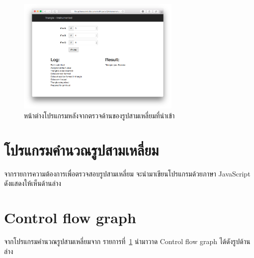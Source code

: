 \documentclass[12pt,a4paper]{article}
\renewcommand{\lstlistingname}{รายการที่}
\begin{document}
    \begin{figure}[h!]
        \label{fig:instrumented}
        \centering
        \includegraphics[width=0.7\textwidth]{img/instrumented.png}
        \caption{หน้าต่างโปรแกรมหลังจากตรวจด้านของรูปสามเหลี่ยมที่นำเข้า}
    \end{figure}

\clearpage
\section{โปรแกรมคำนวณรูปสามเหลี่ยม}
\label{listing:trianglecal}
จากรายการความต้องการเพื่อตรวจสอบรูปสามเหลี่ยม จะนำมาเขียนโปรแกรมด้วยภาษา JavaScript ดังแสดงให้เห็นด้านล่าง


\newpage
\section{Control flow graph}
จากโปรแกรมคำนวณรูปสามเหลี่ยมจาก \lstlistingname\, \ref{listing:trianglecal} นำมาวาด Control flow graph ได้ดังรูปด้านล่าง
\end{document}
